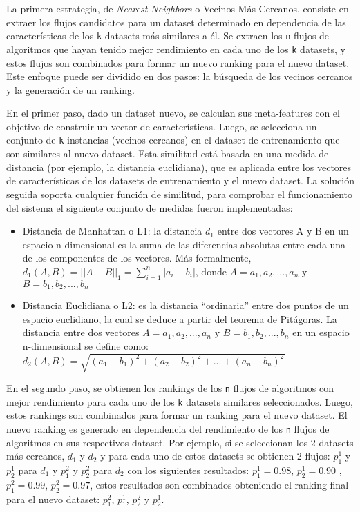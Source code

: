 La primera estrategia, de \textit{Nearest Neighbors} o Vecinos Más Cercanos, consiste en extraer los flujos candidatos para un dataset determinado en dependencia de las características de los \texttt{k} datasets más similares a él. Se extraen los \texttt{n} flujos de algoritmos que hayan tenido mejor rendimiento en cada uno de los \texttt{k} datasets, y estos flujos son combinados para formar un nuevo ranking para el nuevo dataset. Este enfoque puede ser dividido en dos pasos: la búsqueda de los vecinos cercanos y la generación de un ranking.

En el primer paso, dado un dataset nuevo, se calculan sus meta-features con el objetivo de construir un vector de características. Luego, se selecciona un conjunto de \texttt{k} instancias (vecinos cercanos) en el dataset de entrenamiento que son similares al nuevo dataset. Esta similitud está basada en una medida de distancia (por ejemplo, la distancia euclidiana), que es aplicada entre los vectores de características de los datasets de entrenamiento y el nuevo dataset. La solución seguida soporta cualquier función de similitud, para comprobar el funcionamiento del sistema el siguiente conjunto de medidas fueron implementadas:

\begin{itemize}
	\item Distancia de Manhattan o L1: la distancia $d_1$ entre dos vectores A y B en un espacio n-dimensional es la suma de las diferencias absolutas entre cada una de los componentes de los vectores. Más formalmente, $d_1(A, B) = {||A - B||}_1 = \sum^n_{i=1} |a_i - b_i|$, donde $A = a_1, a_2, ..., a_n$ y $B = b_1, b_2, ..., b_n$
	\item Distancia Euclidiana o L2: es la distancia ``ordinaria'' entre dos puntos de un espacio euclidiano, la cual se deduce a partir del teorema de Pitágoras. La distancia entre dos vectores $A = a_1, a_2, ..., a_n$ y $B = b_1, b_2, ..., b_n$ en un espacio n-dimensional se define como: $d_2(A, B)=\sqrt{(a_1 - b_1)^2 + (a_2 - b_2)^2 + ... + (a_n - b_n)^2}$
\end{itemize}

En el segundo paso, se obtienen los rankings de los \texttt{n} flujos de algoritmos con mejor rendimiento para cada uno de los \texttt{k} datasets similares seleccionados. Luego, estos rankings son combinados para formar un ranking para el nuevo dataset. El nuevo ranking es generado en dependencia del rendimiento de los \texttt{n} flujos de algoritmos en sus respectivos dataset. Por ejemplo, si se seleccionan los $2$ datasets más cercanos, $d_1$ y $d_2$ y para cada uno de estos datasets se obtienen $2$ flujos: $p^1_1$ y $p^1_2$ para $d_1$ y $p^2_1$ y $p^2_2$ para $d_2$ con los siguientes resultados: $p^1_1 = 0.98$, $p^1_2 = 0.90$ , $p^2_1 = 0.99$, $p^2_2 = 0.97$, estos resultados son combinados obteniendo el ranking final para el nuevo dataset: $p^2_1$, $p^1_1$, $p^2_2$ y $p^1_2$.

